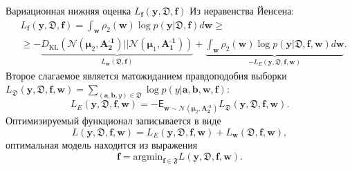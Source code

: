 \documentclass{beamer}
\newcommand{\PP}{p}
\newcommand{\DD}{{\mathfrak{D}}}
\newcommand{\FFF}{{\mathfrak{F}}}
\newcommand{\bw}{{\textbf{w}}}
\newcommand{\ba}{{\textbf{a}}}
\newcommand{\bb}{{\textbf{b}}}
\newcommand{\bbf}{{\textbf{f}}}
\newcommand{\by}{{\textbf{y}}}
\newcommand{\bAo}{\mathbf{A^\text{-1}_\text{1}}}
\newcommand{\bAt}{\mathbf{A^\text{-1}_\text{2}}}
\newcommand{\bmuo}{{\boldsymbol{\mu}_1}}
\newcommand{\bmut}{{\boldsymbol{\mu}_2}}
\newcommand{\DKL}{\mathit{D}_{\text{KL}}}
\begin{document}
\begin{frame}{Вариационная нижняя оценка $L_\bbf(\by,\DD,\bbf)$}
Из неравенства Йенсена:
\begin{align*}
&L_\bbf(\by,\DD,\bbf)= \int_{\bw}\rho_2(\bw)\log\PP(\by|\DD,\bbf)d\bw \geq\\
&\geq-\underbrace{\DKL(\mathcal{N}(\bmut,\bAt)||\mathcal{N}(\bmuo,\bAo))}_{L_\bw(\DD,\bbf)}+ \underbrace{\int_{\bw}\rho_2(\bw)\log\PP(\by|\DD,\bbf,\bw)d\bw}_{-L_E(\by,\DD,\bbf,\bw)}.
\end{align*}
Второе слагаемое является матожиданием правдоподобия выборки $L_\DD(\by,\DD, \bbf,\bw) = \sum_{(\ba,\bb,y)\in\DD} \log\PP(y|\ba,\bb,\bw,\bbf)$:
$$L_E(\by,\DD,\bbf,\bw) = -\mathsf{E}_{\bw\sim \mathcal{N}(\bmut,\bAt)}L_\DD(\by,\DD, \bbf,\bw).$$
Оптимизируемый функционал записывается в виде
$$L(\by,\DD,\bbf,\bw) = L_E(\by,\DD,\bbf,\bw) + L_\bw(\DD,\bbf,\bw),$$
оптимальная модель находится из выражения
$$\bbf = \text{argmin}_{\bbf \in \FFF}L(\by,\DD,\bbf,\bw).$$%


\end{frame}

%	
%
\end{document}
